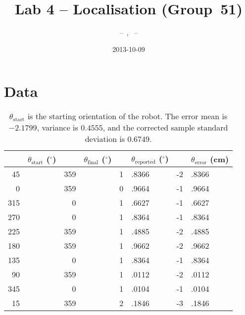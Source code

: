 \documentclass[twocolumn]{article}
\author{\bname~--~\bid, \name~--~\id}
\title{Lab 4 -- Localisation (Group~51)}
\date{2013-10-09}
\def\degree{\ensuremath{^\circ}}
\begin{document}
\maketitle



\section{Data}

\begin{table*}[htb]
\begin{center}\begin{tabular}{r@{}l r@{}l r@{}l r@{}l}
&$\theta_{\text{start}}$ (\degree)& &$\theta_{\text{final}}$ (\degree)& &$\theta_{\text{reported}}$ (\degree)& &$\theta_{\text{error}}$ (cm) \\
\hline
45&& 359&& 1&.8366& -2&.8366 \\
0&& 359&& 0&.9664& -1&.9664 \\
315&& 0&& 1&.6627& -1&.6627 \\
270&& 0&& 1&.8364& -1&.8364 \\
225&& 359&& 1&.4885& -2&.4885 \\
180&& 359&& 1&.9662& -2&.9662 \\
135&& 0&& 1&.8364& -1&.8364 \\
90&& 359&& 1&.0112& -2&.0112 \\
345&& 0&& 1&.0104& -1&.0104 \\
15&& 359&& 2&.1846& -3&.1846 \\
\end{tabular}\end{center}
\caption{$\theta_{\text{start}}$ is the starting orientation of the robot.
The error mean is $-2.1799$, variance is $0.4555$, and the corrected sample standard deviation is $0.6749$.}
\label{open}
\end{table*}
\end{document}
